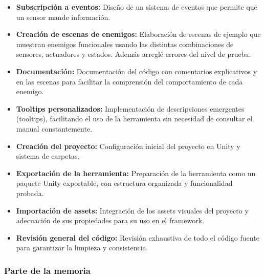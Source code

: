 \begin{itemize}
  \item \textbf{Subscripción a eventos:} Diseño de un sistema de eventos que permite que un sensor mande información.
  \item \textbf{Creación de escenas de enemigos:} Elaboración de escenas de ejemplo que muestran enemigos funcionales usando las distintas combinaciones de sensores, actuadores y estados. Además arreglé errores del nivel de prueba.
  \item \textbf{Documentación:} Documentación del código con comentarios explicativos y en las escenas para facilitar la comprensión del comportamiento de cada enemigo.
  \item \textbf{Tooltips personalizados:} Implementación de descripciones emergentes (tooltips), facilitando el uso de la herramienta sin necesidad de consultar el manual constantemente.
 \item \textbf{Creación del proyecto:} Configuración inicial del proyecto en Unity y sistema de carpetas.
 \item \textbf{Exportación de la herramienta:} Preparación de la herramienta como un paquete Unity exportable, con estructura organizada y funcionalidad probada. 
  \item \textbf{Importación de assets:} Integración de los assets visuales del proyecto y adecuación de sus propiedades para su uso en el framework.
  \item \textbf{Revisión general del código:} Revisión exhaustiva de todo el código fuente para garantizar la limpieza y consistencia.
\end{itemize}

\subsubsection*{Parte de la memoria}

